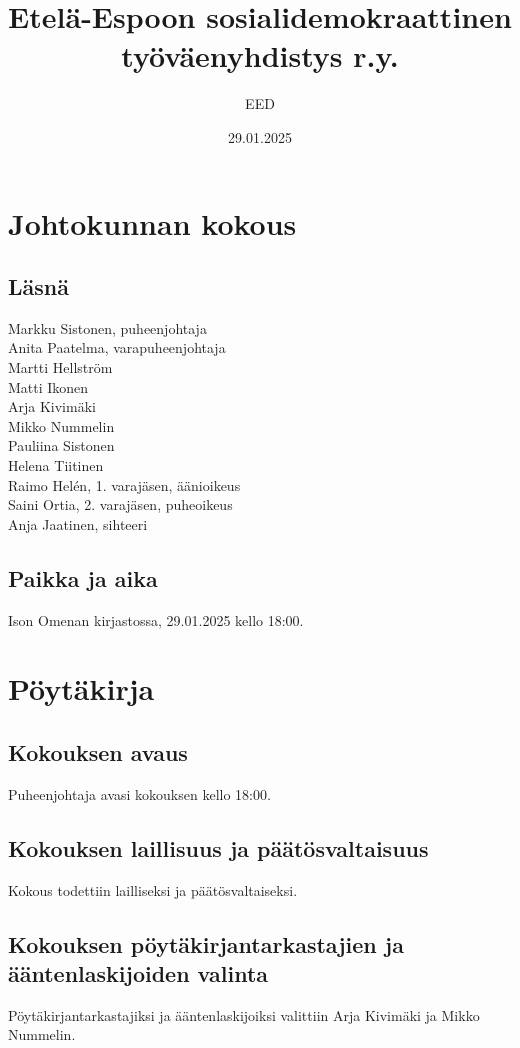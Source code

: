 \documentclass[a4paper,12pt]{article}
\title{Etelä-Espoon sosialidemokraattinen työväenyhdistys r.y.}
\author{EED}
\date{29.01.2025}
\begin{document}
\maketitle
\tableofcontents
\section*{Johtokunnan kokous}
\subsection*{Läsnä}
\begin{flushleft}
  Markku Sistonen, puheenjohtaja \\
  Anita Paatelma, varapuheenjohtaja \\
  Martti Hellström \\
  Matti Ikonen \\
  Arja Kivimäki \\
  Mikko Nummelin \\
  Pauliina Sistonen \\
  Helena Tiitinen \\
  Raimo Helén, 1. varajäsen, äänioikeus \\
  Saini Ortia, 2. varajäsen, puheoikeus \\
  Anja Jaatinen, sihteeri
\end{flushleft}
\subsection*{Paikka ja aika}
Ison Omenan kirjastossa, 29.01.2025 kello 18:00.
\section*{Pöytäkirja}
\subsection{Kokouksen avaus}
Puheenjohtaja avasi kokouksen kello 18:00.
\subsection{Kokouksen laillisuus ja päätösvaltaisuus}
Kokous todettiin lailliseksi ja päätösvaltaiseksi.
\subsection{Kokouksen pöytäkirjantarkastajien ja ääntenlaskijoiden valinta}
Pöytäkirjantarkastajiksi ja ääntenlaskijoiksi valittiin Arja Kivimäki ja Mikko Nummelin.
\end{document}
